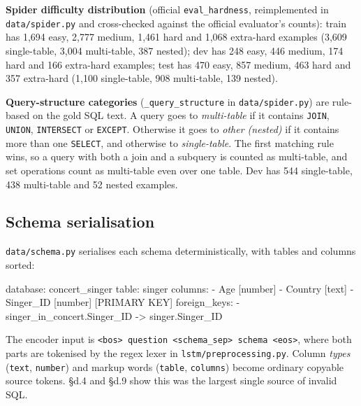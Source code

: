 \documentclass[
  10pt,
]{article}
\newenvironment{Shaded}{}{}
\newcommand{\NormalTok}[1]{#1}
\begin{document}
\textbf{Spider difficulty distribution} (official
\texttt{eval\_hardness}, reimplemented in \texttt{data/spider.py} and
cross-checked against the official evaluator's counts): train has 1,694
easy, 2,777 medium, 1,461 hard and 1,068 extra-hard examples (3,609
single-table, 3,004 multi-table, 387 nested); dev has 248 easy, 446
medium, 174 hard and 166 extra-hard examples; test has 470 easy, 857
medium, 463 hard and 357 extra-hard (1,100 single-table, 908
multi-table, 139 nested).

\textbf{Query-structure categories} (\texttt{\_query\_structure} in
\texttt{data/spider.py}) are rule-based on the gold SQL text. A query
goes to \emph{multi-table} if it contains \texttt{JOIN}, \texttt{UNION},
\texttt{INTERSECT} or \texttt{EXCEPT}. Otherwise it goes to \emph{other
(nested)} if it contains more than one \texttt{SELECT}, and otherwise to
\emph{single-table}. The first matching rule wins, so a query with both
a join and a subquery is counted as multi-table, and set operations
count as multi-table even over one table. Dev has 544 single-table, 438
multi-table and 52 nested examples.

\subsection{Schema serialisation}\label{schema-serialisation}

\texttt{data/schema.py} serialises each schema deterministically, with
tables and columns sorted:

\begin{Shaded}
\begin{Highlighting}[]
\NormalTok{database: concert\_singer}
\NormalTok{table: singer}
\NormalTok{columns:}
\NormalTok{  {-} Age [number]}
\NormalTok{  {-} Country [text]}
\NormalTok{  {-} Singer\_ID [number] [PRIMARY KEY]}
\NormalTok{foreign\_keys:}
\NormalTok{  {-} singer\_in\_concert.Singer\_ID {-}\textgreater{} singer.Singer\_ID}
\end{Highlighting}
\end{Shaded}

The encoder input is
\texttt{\textless{}bos\textgreater{}\ question\ \textless{}schema\_sep\textgreater{}\ schema\ \textless{}eos\textgreater{}},
where both parts are tokenised by the regex lexer in
\texttt{lstm/preprocessing.py}. Column \emph{types} (\texttt{text},
\texttt{number}) and markup words (\texttt{table}, \texttt{columns})
become ordinary copyable source tokens. §d.4 and §d.9 show this was the
largest single source of invalid SQL.
\end{document}
